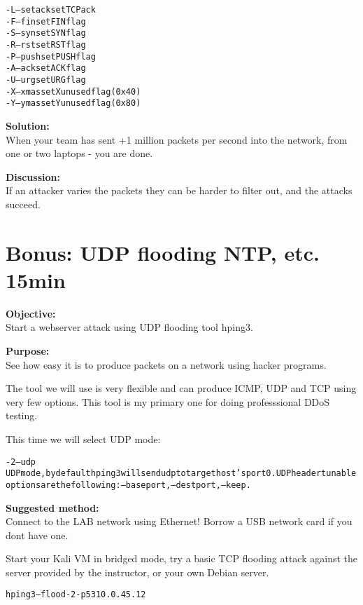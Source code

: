 \documentclass[a4paper,11pt,notitlepage]{report}
\begin{document}
\begin{alltt}
-L  --setack     set TCP ack
-F  --fin        set FIN flag
-S  --syn        set SYN flag
-R  --rst        set RST flag
-P  --push       set PUSH flag
-A  --ack        set ACK flag
-U  --urg        set URG flag
-X  --xmas       set X unused flag (0x40)
-Y  --ymas       set Y unused flag (0x80)
\end{alltt}





{\bf Solution:}\\
When your team has sent +1 million packets per second into the network, from one or two laptops - you are done.

{\bf Discussion:}\\
If an attacker varies the packets they can be harder to filter out, and the attacks succeed.

\chapter{Bonus: UDP flooding NTP, etc. 15min}


{\bf Objective:}\\
Start a webserver attack using UDP flooding tool hping3.

{\bf Purpose:}\\
See how easy it is to produce packets on a network using hacker programs.

The tool we will use is very flexible and can produce ICMP, UDP and TCP using very few options. This tool is my primary one for doing professsional DDoS testing.

This time we will select UDP mode:

\begin{alltt}\footnotesize
-2 --udp
       UDP mode, by default hping3 will send udp to target host's port 0.  UDP header  tunable
       options are the following: --baseport, --destport, --keep.
\end{alltt}

{\bf Suggested method:}\\
Connect to the LAB network using Ethernet! Borrow a USB network card if you dont have one.

Start your Kali VM in bridged mode, try a basic TCP flooding attack against the server provided by the instructor, or your own Debian server.

\begin{alltt}\footnotesize
hping3 --flood -2 -p 53 10.0.45.12
\end{alltt}
\end{document}
